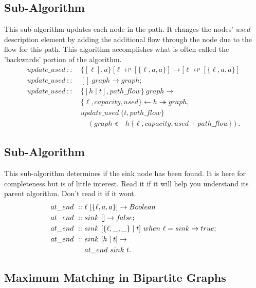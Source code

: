 \documentclass[a4paper,10pt]{book}
\newcommand\when{\  when\ }
\newcommand{\false}{f\kern-0.25ex{alse}}
\begin{document}
\subsection{Sub-Algorithm}
This sub-algorithm updates each node in the path. It changes the nodes' $used$ description element by adding the additional flow through the node due to the flow for this path. This algorithm accomplishes what is often called the 'backwards' portion of the algorithm.
\begin{align*}
update\_used\ ::\ &\{[\ell],a\}\ [\ell\looparrowleft [\{\ell,a,a\}]\rightarrow [\ell\looparrowleft [\{\ell,a,a\}]\\
update\_used\ ::\ &[]\ graph\rightarrow graph;\\
update\_used\ ::\ &\{[h\mid t],path\_flow\}\ graph\rightarrow\\
	&\{\ell,capacity,used\}\leftarrow h\twoheadrightarrow graph,\\
	&update\_used\ \{t,path\_flow\}\\
	&\quad(graph\twoheadleftarrow\ h\ \{\ell,capacity,used+path\_flow\}).
\end{align*}
\subsection{Sub-Algorithm}
This sub-algorithm determines if the sink node has been found. It is here for completeness but is of little interest. Read it if it will help you understand its parent algorithm. Don't read it if it wont.
\begin{align*}
at\_end\ ::\ &\ell\ [\{\ell,a,a\}]\rightarrow Boolean\\
at\_end\ ::\ &sink\ []\rightarrow\false;\\
at\_end\ ::\ &sink\ [\{\ell,\_,\_\}\mid t]\when \ell=sink\rightarrow true;\\
at\_end\ ::\ &sink\ [h\mid t]\rightarrow\\
	&at\_end\ sink\ t.
\end{align*}
\subsection{Maximum Matching in Bipartite Graphs}
\end{document}
